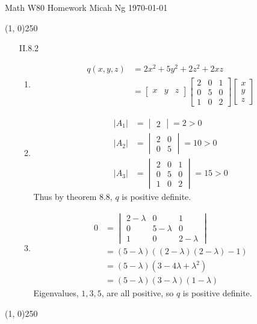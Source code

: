 \documentclass[11pt,letterpaper]{article}
\begin{document}
\noindent
Math W80 Homework \hfill Micah Ng \hfill \today

\begin{center}
\line(1, 0){250}
\end{center}

\begin{enumerate}
\item[II.8.2]
  \begin{enumerate}
  \item
    \begin{align*}
      q(x,y,z) &= 2x^2+5y^2+2z^2+2xz \\
          &= \begin{bmatrix}x & y & z\end{bmatrix}
             \begin{bmatrix}
               2 & 0 & 1 \\
               0 & 5 & 0 \\
               1 & 0 & 2
             \end{bmatrix}
             \begin{bmatrix}x \\ y \\ z\end{bmatrix}
    \end{align*}

  \item
    \begin{align*}
      |A_1| &= \begin{vmatrix}2\end{vmatrix} = 2 > 0 \\
      |A_2| &= \begin{vmatrix}2 & 0 \\ 0 & 5 \end{vmatrix} = 10 > 0 \\
      |A_3| &= 
             \begin{vmatrix}
               2 & 0 & 1 \\
               0 & 5 & 0 \\
               1 & 0 & 2
             \end{vmatrix}
            = 15 > 0
    \end{align*}
    Thus by theorem 8.8, $q$ is positive definite.

  \item
    \begin{align*}
      0 &= \begin{vmatrix}
             2-\lambda & 0 & 1 \\
             0 & 5-\lambda & 0 \\
             1 & 0 & 2-\lambda
           \end{vmatrix} \\
        &= (5-\lambda)((2-\lambda)(2-\lambda)-1) \\
        &= (5-\lambda)\left(3-4\lambda+\lambda^2\right) \\
        &= (5-\lambda)(3-\lambda)(1-\lambda)
    \end{align*}
    Eigenvalues, $1,3,5$, are all positive, so $q$ is positive definite.
  \end{enumerate}
\end{enumerate}

\begin{center}
\line(1, 0){250}
\end{center}
\end{document}
